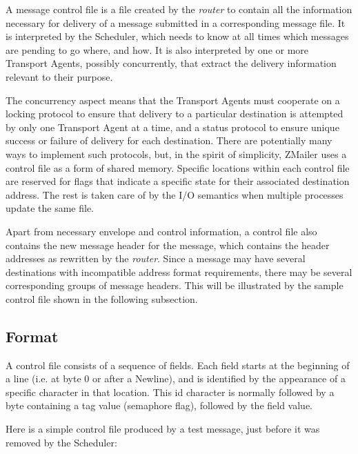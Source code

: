 A message control file is a file created by the {\em router\/} to contain all the
information necessary for delivery of a message submitted in a
corresponding message file.  It is interpreted by the Scheduler, which
needs to know at all times which messages are pending to go where, and how.
It is also interpreted by one or more Transport Agents, possibly
concurrently, that extract the delivery information relevant to their
purpose.

The concurrency aspect means that the Transport Agents must cooperate on a
locking protocol to ensure that delivery to a particular destination is
attempted by only one Transport Agent at a time, and a status protocol to
ensure unique success or failure of delivery for each destination.  There
are potentially many ways to implement such protocols, but, in the spirit
of simplicity, ZMailer uses a control file as a form of shared memory.
Specific locations within each control file are reserved for flags that
indicate a specific state for their associated destination address.  The
rest is taken care of by the I/O semantics when multiple processes update
the same file.

Apart from necessary envelope and control information, a control file also
contains the new message header for the message, which contains the header
addresses as rewritten by the {\em router\/}.  Since a message may have several
destinations with incompatible address format requirements, there may be
several corresponding groups of message headers.  This will be illustrated
by the sample control file shown in the following subsection.




\subsection{Format}

A control file consists of a sequence of fields.  Each field starts at the
beginning of a line (i.e. at byte 0 or after a Newline), and is identified
by the appearance of a specific character in that location.  This id
character is normally followed by a byte containing a tag value (semaphore
flag), followed by the field value.

Here is a simple control file produced by a test message, just before it
was removed by the Scheduler:

